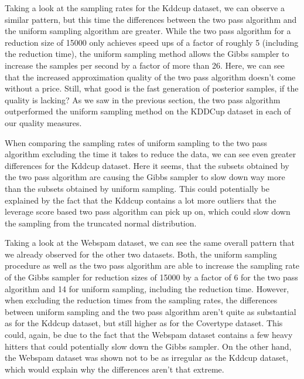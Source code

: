 Taking a look at the sampling rates for the Kddcup dataset,
we can observe a similar pattern,
but this time the differences between the two pass algorithm
and the uniform sampling algorithm are greater. While the
two pass algorithm for a reduction size of 15000
only achieves speed ups of a factor of
roughly 5 (including the reduction time), the uniform sampling
method allows the Gibbs sampler to increase the samples
per second by a factor of more than 26.
Here, we can see that the increased approximation quality of
the two pass algorithm doesn't come without a price. Still,
what good is the fast generation of posterior samples, if the
quality is lacking? As we saw in the previous section, the
two pass algorithm outperformed the uniform sampling method
on the KDDCup dataset in each of our quality measures.

When comparing the sampling rates of uniform sampling to the
two pass algorithm excluding the time it takes to reduce the data,
we can see even greater differences for the Kddcup dataset.
Here it seems, that the subsets obtained by the two pass algorithm
are causing the Gibbs sampler to slow down way more than the
subsets obtained by uniform sampling.
This could potentially be explained by the fact that the Kddcup
contains a lot more outliers that the leverage score based two
pass algorithm can pick up on, which could slow down the
sampling from the truncated normal distribution.

Taking a look at the Webspam dataset, we can
see the same overall pattern that we already observed for the
other two datasets. Both, the uniform sampling procedure as well as
the two pass algorithm are able to increase the sampling rate
of the Gibbs sampler for reduction sizes of 15000 by a factor
of 6 for the two pass algorithm and 14 for uniform sampling,
including the reduction time.
However, when excluding the reduction times from the sampling
rates, the differences between uniform sampling and the two
pass algorithm aren't quite as substantial as for the Kddcup dataset,
but still higher as for the Covertype dataset.
This could, again, be due to the fact that the Webspam dataset
contains a few heavy hitters that could potentially slow down
the Gibbs sampler. On the other hand, the Webspam dataset was
shown not to be as irregular as the Kddcup dataset, which would
explain why the differences aren't that extreme.
